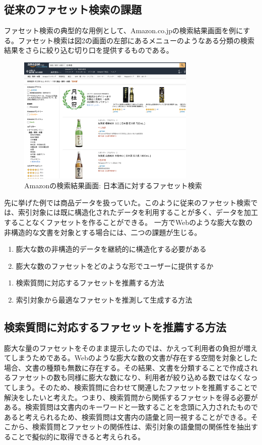 \documentclass[a4j,10pt, twocolumn]{jarticle}
\begin{document}
\subsection{従来のファセット検索の課題}
 ファセット検索の典型的な用例として、Amazon.co.jp\cite{amazon}の検索結果画面を例にする。ファセット検索は図2の画面の左部にあるメニューのようなある分類の検索結果をさらに絞り込む切り口を提供するものである。
 \begin{figure}[h]
   \includegraphics[width=85mm]{./amazon.png}
   \caption{Amazonの検索結果画面: 日本酒に対するファセット検索}
 \end{figure}
  先に挙げた例では商品データを扱っていた。このように従来のファセット検索では、索引対象には既に構造化されたデータを利用することが多く、データを加工することなくファセットを作ることができる。
  一方でWebのような膨大な数の非構造的な文書を対象とする場合には、二つの課題が生じる。
\begin{enumerate}
  \item 膨大な数の非構造的データを継続的に構造化する必要がある
  \item 膨大な数のファセットをどのような形でユーザーに提供するか
\end{enumerate}
\begin{enumerate}
  \item 検索質問に対応するファセットを推薦する方法
  \item 索引対象から最適なファセットを推測して生成する方法
\end{enumerate}

\subsection{検索質問に対応するファセットを推薦する方法}
 膨大な量のファセットをそのまま提示したのでは、かえって利用者の負担が増えてしまうためである。Webのような膨大な数の文書が存在する空間を対象とした場合、文書の種類も無数に存在する。その結果、文書を分類することで作成されるファセットの数も同様に膨大な数になり、利用者が絞り込める数ではなくなってしまう。そのため、検索質問に合わせて関連したファセットを推薦することで解決をしたいと考えた。つまり、検索質問から関係するファセットを得る必要がある。検索質問は文書内のキーワードと一致することを念頭に入力されたものであると考えられるため、検索質問は文書内の語彙と同一視することができる。そこから、検索質問とファセットの関係性は、索引対象の語彙間の関係性を抽出することで擬似的に取得できると考えられる。
\end{document}
